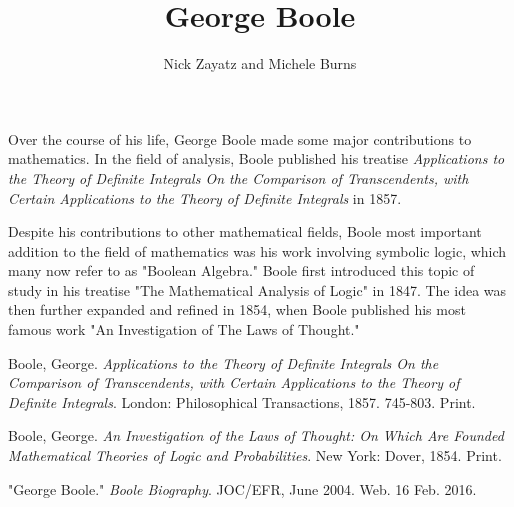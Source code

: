 \documentclass[12]{article} %
\title{George Boole}
\author{Nick Zayatz and Michele Burns}
\begin{document}
\maketitle %

Over the course of his life, George Boole made some major contributions to mathematics. In the field of analysis, Boole published his treatise \textit{Applications to the Theory of Definite Integrals On the Comparison of Transcendents, with Certain Applications to the Theory of Definite Integrals} in 1857.

Despite his contributions to other mathematical fields, Boole most important addition to the field of mathematics was his work involving symbolic logic, which many now refer to as "Boolean Algebra." Boole first introduced this topic of study in his treatise "The Mathematical Analysis of Logic" in 1847. The idea was then further expanded and refined in 1854, when Boole published his most famous work "An Investigation of The Laws of Thought."

\newpage



\begin{thebibliography}{9}
Boole, George. 
\textit{Applications to the Theory of Definite Integrals On the Comparison of Transcendents, with Certain Applications to the Theory of Definite Integrals}. 
London: Philosophical Transactions, 1857. 745-803. Print.
 
Boole, George. 
\textit{An Investigation of the Laws of Thought: On Which Are Founded Mathematical Theories of Logic and Probabilities}.
New York: Dover, 1854. Print.
 
"George Boole."
\textit{Boole Biography}.
JOC/EFR, June 2004. Web. 16 Feb. 2016. 
\end{thebibliography}
\end{document}
